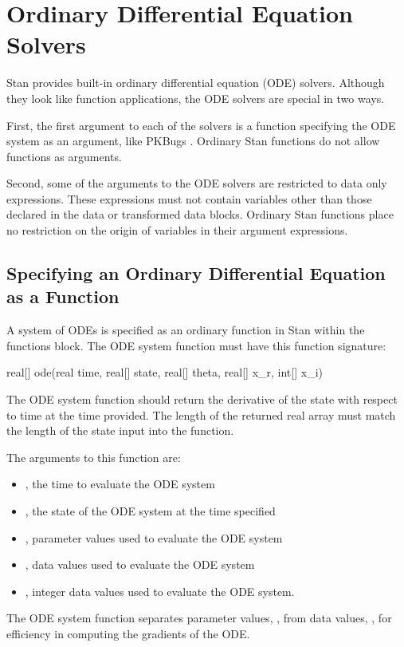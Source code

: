 \chapter{Ordinary Differential Equation Solvers}
\label{functions-ode-solver.chapter}

Stan provides built-in ordinary differential equation (ODE) solvers.
Although they look like function applications, the ODE solvers are
special in two ways.

First, the first argument to each of the solvers is a function
specifying the ODE system as an argument, like PKBugs
\citep{LunnEtAl:1999}. Ordinary Stan functions do not allow functions
as arguments.

Second, some of the arguments to the ODE solvers are restricted to
data only expressions. These expressions must not contain variables
other than those declared in the data or transformed data blocks.
Ordinary Stan functions place no restriction on the origin of variables
in their argument expressions.

\section{Specifying an Ordinary Differential Equation as a Function}
\label{functions-ode-function.section}

A system of ODEs is specified as an ordinary function in Stan within
the functions block. The ODE system function must have this function
signature:
%
\begin{stancode}
real[] ode(real time,
           real[] state,
           real[] theta,
           real[] x_r,
           int[] x_i)
\end{stancode}
%
The ODE system function should return the derivative of the state
with respect to time at the time provided. The length of the returned
real array must match the length of the state input into the
function.

The arguments to this function are:
\begin{itemize}
\item {}, the time to evaluate the ODE system
\item {}, the state of the ODE system at the time specified
\item {}, parameter values used to evaluate the ODE system
\item {}, data values used to evaluate the ODE system
\item {}, integer data values used to evaluate the ODE system.
\end{itemize}
%
The ODE system function separates parameter values, , from
data values, , for efficiency in computing the gradients of
the ODE.

